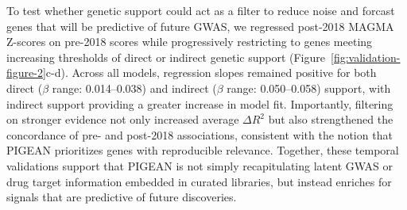 To test whether genetic support could act as a filter to reduce noise and forcast genes that will be predictive of future GWAS, we regressed post-2018 MAGMA Z-scores on pre-2018 scores while progressively restricting to genes meeting increasing thresholds of direct or indirect genetic support (Figure~\ref{fig:validation-figure-2}c-d). Across all models, regression slopes remained positive for both direct ($\beta$ range: 0.014–0.038) and indirect ($\beta$ range: 0.050–0.058) support, with indirect support providing a greater increase in model fit. Importantly, filtering on stronger evidence not only increased average $\Delta R^2$ but also strengthened the concordance of pre- and post-2018 associations, consistent with the notion that PIGEAN prioritizes genes with reproducible relevance. Together, these temporal validations support that PIGEAN is not simply recapitulating latent GWAS or drug target information embedded in curated libraries, but instead enriches for signals that are predictive of future discoveries.  
